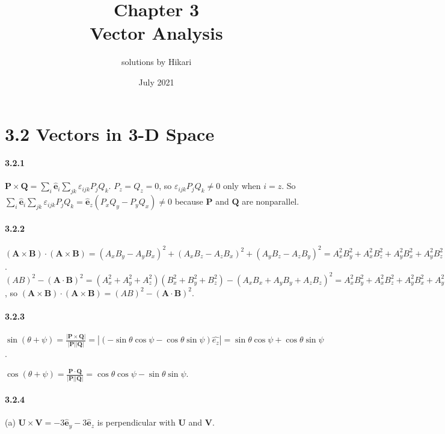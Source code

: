 \documentclass[a4paper]{article}
\title{Chapter 3\\Vector Analysis}
\author{solutions by Hikari}
\date{July 2021}
\begin{document}
\maketitle

\newcommand{\V}{\mathbf}
\newcommand{\M}{\mathrm}
\newcommand{\VE}{\hat{\V{e}}}
\newcommand{\del}{\boldsymbol{\nabla}}
\newcommand{\pdv}[2]{\frac{\partial#1}{\partial#2}}
\newcommand{\ppdv}[3]{\frac{\partial^2#1}{\partial#2\partial#3}}
\newcommand{\dv}[2]{\frac{d #1}{d #2}}

\section*{3.2 Vectors in 3-D Space}

\paragraph{3.2.1}
$\V{P}\times \V{Q}=\sum_i \hat{\V{e}}_i\sum_{jk}\varepsilon_{ijk}P_j Q_k$.  $P_z=Q_z=0$, so $\varepsilon_{ijk}P_j Q_k\neq0$ only when $i=z$. So $\sum_i \hat{\V{e}}_i\sum_{jk}\varepsilon_{ijk}P_j Q_k=\hat{\V{e}}_z(P_xQ_y-P_yQ_x)\neq0$ because $\V{P}$ and $\V{Q}$ are nonparallel.

\paragraph{3.2.2}
$(\V{A}\times \V{B})\cdot(\V{A}\times \V{B})=(A_xB_y-A_yB_x)^2+(A_xB_z-A_zB_x)^2+(A_yB_z-A_zB_y)^2=A_x^2B_y^2+A_x^2B_z^2+A_y^2B_x^2+A_y^2B_z^2+A_z^2B_x^2+A_z^2B_y^2-2A_xB_xA_yB_y-2A_xB_xA_zB_z-2A_yB_yA_zB_z$. $(AB)^2-(\V{A}\cdot \V{B})^2=(A_x^2+A_y^2+A_z^2)(B_x^2+B_y^2+B_z^2)-(A_xB_x+A_yB_y+A_zB_z)^2=A_x^2B_y^2+A_x^2B_z^2+A_y^2B_x^2+A_y^2B_z^2+A_z^2B_x^2+A_z^2B_y^2-2A_xB_xA_yB_y-2A_xB_xA_zB_z-2A_yB_yA_zB_z$, so $(\V{A}\times \V{B})\cdot(\V{A}\times \V{B})=(AB)^2-(\V{A}\cdot \V{B})^2$.

\paragraph{3.2.3}
$\sin(\theta+\psi)=\frac{|\V{P}\times\V{Q}|}{|\V{P}||\V{Q}|}=|(-\sin{\theta}\cos{\psi}-\cos{\theta}\sin{\psi})\hat{e_z}|=\sin{\theta}\cos{\psi}+\cos{\theta}\sin{\psi}$.

$\cos{(\theta+\psi)}=\frac{\V{P}\cdot\V{Q}}{|\V{P}||\V{Q}|}=\cos{\theta}\cos{\psi}-\sin{\theta}\sin{\psi}$.

\paragraph{3.2.4}
(a) $\V{U}\times\V{V}=-3\hat{\V{e}}_y-3\hat{\V{e}}_z$ is perpendicular with $\V{U}$ and $\V{V}$.
\end{document}
